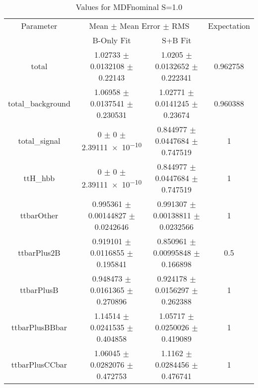 \begin{table}
\centering
\caption{Values for MDFnominal S=1.0}
\begin{tabular}{cccc}
\toprule
Parameter & \multicolumn{2}{c}{Mean $\pm$ Mean Error $\pm$ RMS} & Expectation\\
 & B-Only Fit & S+B Fit & \\
\midrule
total & \num{1.02733} $\pm$ \num{0.0132108} $\pm$ \num{0.22143} & \num{1.0205} $\pm$ \num{0.0132652} $\pm$ \num{0.222341} & \num{0.962758}\\
total\_background & \num{1.06958} $\pm$ \num{0.0137541} $\pm$ \num{0.230531} & \num{1.02771} $\pm$ \num{0.0141245} $\pm$ \num{0.23674} & \num{0.960388}\\
total\_signal & \num{0} $\pm$ \num{0} $\pm$ \num{2.39111e-10} & \num{0.844977} $\pm$ \num{0.0447684} $\pm$ \num{0.747519} & \num{1}\\
ttH\_hbb & \num{0} $\pm$ \num{0} $\pm$ \num{2.39111e-10} & \num{0.844977} $\pm$ \num{0.0447684} $\pm$ \num{0.747519} & \num{1}\\
ttbarOther & \num{0.995361} $\pm$ \num{0.00144827} $\pm$ \num{0.0242646} & \num{0.991307} $\pm$ \num{0.00138811} $\pm$ \num{0.0232566} & \num{1}\\
ttbarPlus2B & \num{0.919101} $\pm$ \num{0.0116855} $\pm$ \num{0.195841} & \num{0.850961} $\pm$ \num{0.00995848} $\pm$ \num{0.166898} & \num{0.5}\\
ttbarPlusB & \num{0.948473} $\pm$ \num{0.0161365} $\pm$ \num{0.270896} & \num{0.924178} $\pm$ \num{0.0156297} $\pm$ \num{0.262388} & \num{1}\\
ttbarPlusBBbar & \num{1.14514} $\pm$ \num{0.0241535} $\pm$ \num{0.404858} & \num{1.05717} $\pm$ \num{0.0250026} $\pm$ \num{0.419089} & \num{1}\\
ttbarPlusCCbar & \num{1.06045} $\pm$ \num{0.0282076} $\pm$ \num{0.472753} & \num{1.1162} $\pm$ \num{0.0284456} $\pm$ \num{0.476741} & \num{1}\\
\bottomrule
\end{tabular}
\end{table}